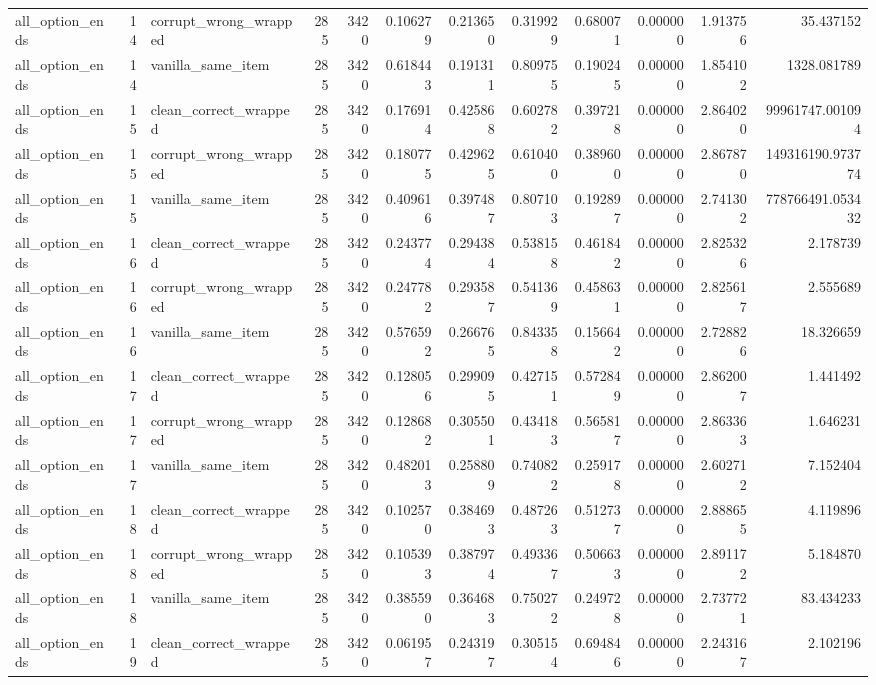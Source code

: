 \begin{tabular}{lrlrrrrrrrrr}
all\_option\_ends & 14 & corrupt\_wrong\_wrapped & 285 & 3420 & 0.106279 & 0.213650 & 0.319929 & 0.680071 & 0.000000 & 1.913756 & 35.437152 \\
all\_option\_ends & 14 & vanilla\_same\_item & 285 & 3420 & 0.618443 & 0.191311 & 0.809755 & 0.190245 & 0.000000 & 1.854102 & 1328.081789 \\
all\_option\_ends & 15 & clean\_correct\_wrapped & 285 & 3420 & 0.176914 & 0.425868 & 0.602782 & 0.397218 & 0.000000 & 2.864020 & 99961747.001094 \\
all\_option\_ends & 15 & corrupt\_wrong\_wrapped & 285 & 3420 & 0.180775 & 0.429625 & 0.610400 & 0.389600 & 0.000000 & 2.867870 & 149316190.973774 \\
all\_option\_ends & 15 & vanilla\_same\_item & 285 & 3420 & 0.409616 & 0.397487 & 0.807103 & 0.192897 & 0.000000 & 2.741302 & 778766491.053432 \\
all\_option\_ends & 16 & clean\_correct\_wrapped & 285 & 3420 & 0.243774 & 0.294384 & 0.538158 & 0.461842 & 0.000000 & 2.825326 & 2.178739 \\
all\_option\_ends & 16 & corrupt\_wrong\_wrapped & 285 & 3420 & 0.247782 & 0.293587 & 0.541369 & 0.458631 & 0.000000 & 2.825617 & 2.555689 \\
all\_option\_ends & 16 & vanilla\_same\_item & 285 & 3420 & 0.576592 & 0.266765 & 0.843358 & 0.156642 & 0.000000 & 2.728826 & 18.326659 \\
all\_option\_ends & 17 & clean\_correct\_wrapped & 285 & 3420 & 0.128056 & 0.299095 & 0.427151 & 0.572849 & 0.000000 & 2.862007 & 1.441492 \\
all\_option\_ends & 17 & corrupt\_wrong\_wrapped & 285 & 3420 & 0.128682 & 0.305501 & 0.434183 & 0.565817 & 0.000000 & 2.863363 & 1.646231 \\
all\_option\_ends & 17 & vanilla\_same\_item & 285 & 3420 & 0.482013 & 0.258809 & 0.740822 & 0.259178 & 0.000000 & 2.602712 & 7.152404 \\
all\_option\_ends & 18 & clean\_correct\_wrapped & 285 & 3420 & 0.102570 & 0.384693 & 0.487263 & 0.512737 & 0.000000 & 2.888655 & 4.119896 \\
all\_option\_ends & 18 & corrupt\_wrong\_wrapped & 285 & 3420 & 0.105393 & 0.387974 & 0.493367 & 0.506633 & 0.000000 & 2.891172 & 5.184870 \\
all\_option\_ends & 18 & vanilla\_same\_item & 285 & 3420 & 0.385590 & 0.364683 & 0.750272 & 0.249728 & 0.000000 & 2.737721 & 83.434233 \\
all\_option\_ends & 19 & clean\_correct\_wrapped & 285 & 3420 & 0.061957 & 0.243197 & 0.305154 & 0.694846 & 0.000000 & 2.243167 & 2.102196 \\

\end{tabular}
